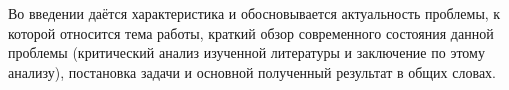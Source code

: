 \Introduction

Во введении даётся характеристика и обосновывается актуальность проблемы, к которой относится тема работы, краткий обзор современного состояния данной проблемы (критический анализ изученной литературы и заключение по этому анализу), постановка задачи и основной полученный результат в общих словах.
